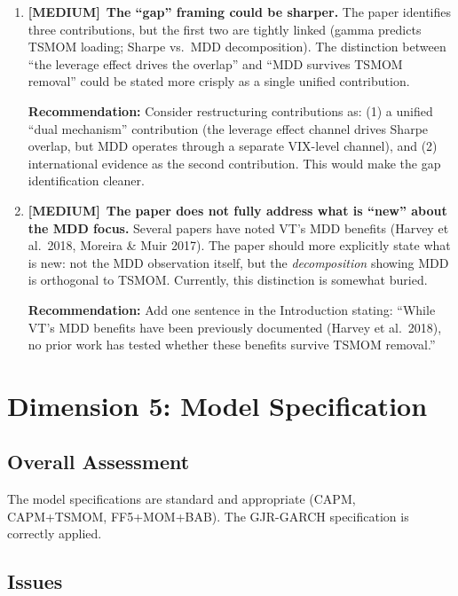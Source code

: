 \documentclass[12pt,a4paper]{article}
\newcommand{\MEDIUM}{\textcolor{medsev}{\textbf{[MEDIUM]}}}
\begin{document}
\begin{enumerate}[label=\textbf{4.\arabic*}]

\item \MEDIUM\ \textbf{The ``gap'' framing could be sharper.}
The paper identifies three contributions, but the first two are tightly linked (gamma predicts TSMOM loading; Sharpe vs.\ MDD decomposition). The distinction between ``the leverage effect drives the overlap'' and ``MDD survives TSMOM removal'' could be stated more crisply as a single unified contribution.

\textbf{Recommendation:} Consider restructuring contributions as: (1) a unified ``dual mechanism'' contribution (the leverage effect channel drives Sharpe overlap, but MDD operates through a separate VIX-level channel), and (2) international evidence as the second contribution. This would make the gap identification cleaner.

\item \MEDIUM\ \textbf{The paper does not fully address what is ``new'' about the MDD focus.}
Several papers have noted VT's MDD benefits (Harvey et al.\ 2018, Moreira \& Muir 2017). The paper should more explicitly state what is new: not the MDD observation itself, but the \textit{decomposition} showing MDD is orthogonal to TSMOM. Currently, this distinction is somewhat buried.

\textbf{Recommendation:} Add one sentence in the Introduction stating: ``While VT's MDD benefits have been previously documented (Harvey et al.\ 2018), no prior work has tested whether these benefits survive TSMOM removal.''

\end{enumerate}


\section{Dimension 5: Model Specification}

\subsection*{Overall Assessment}
The model specifications are standard and appropriate (CAPM, CAPM+TSMOM, FF5+MOM+BAB). The GJR-GARCH specification is correctly applied.

\subsection*{Issues}
\end{document}
